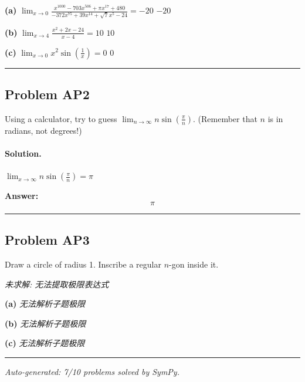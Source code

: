 \documentclass[12pt, a4paper]{article}
\newcommand{\problem}[1]{\subsection*{Problem #1}}
\newcommand{\solution}{\paragraph{Solution.}}
\begin{document}
\textbf{(a)}
$\lim_{x \to 0} \frac{x^{1000} - 703 x^{506} + \pi x^{17} + 480}{- 372 x^{75} + 39 x^{14} + \sqrt{7} x^{5} - 24} = -20$
$\boxed{-20}$

\textbf{(b)}
$\lim_{x \to 4} \frac{x^{2} + 2 x - 24}{x - 4} = 10$
$\boxed{10}$

\textbf{(c)}
$\lim_{x \to 0} x^{2} \sin{\left(\frac{1}{x} \right)} = 0$
$\boxed{0}$

\vspace{1em}
\hrule
\vspace{1em}

\problem{AP2}

Using a calculator, try to guess $\lim_{n \to \infty} n \sin(\frac{\pi}{n})$. (Remember that $n$ is in radians, not degrees!)

\solution

$\lim_{x \to \infty} n \sin{\left(\frac{\pi}{n} \right)} = \pi$

\textbf{Answer:}
\[\boxed{\pi}\]

\vspace{1em}
\hrule
\vspace{1em}

\problem{AP3}

Draw a circle of radius 1. Inscribe a regular $n$-gon inside it.

\textit{\color{red} 未求解: 无法提取极限表达式}

\textbf{(a)}
\textit{\color{red} 无法解析子题极限}

\textbf{(b)}
\textit{\color{red} 无法解析子题极限}

\textbf{(c)}
\textit{\color{red} 无法解析子题极限}

\vspace{1em}
\hrule
\vspace{1em}


\vspace{2em}
\noindent\textit{Auto-generated: 7/10 problems solved by SymPy.}
\end{document}
